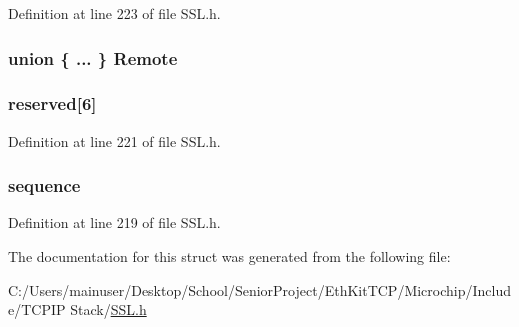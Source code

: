 Definition at line 223 of file S\+S\+L.\+h.

\hypertarget{struct_s_s_l___k_e_y_s_ac5c4b1f50a5eb4f54b15aba0d9add2de}{}
\subsubsection[{Remote}]{\setlength{\rightskip}{0pt plus 5cm}union \{ ... \}   Remote}\label{struct_s_s_l___k_e_y_s_ac5c4b1f50a5eb4f54b15aba0d9add2de}
\hypertarget{struct_s_s_l___k_e_y_s_a978913f88617d12113203d8129ab02a1}{}
\subsubsection[{reserved}]{ reserved\mbox{[}6\mbox{]}}\label{struct_s_s_l___k_e_y_s_a978913f88617d12113203d8129ab02a1}


Definition at line 221 of file S\+S\+L.\+h.

\hypertarget{struct_s_s_l___k_e_y_s_a8ae5d5027313c26248c36c3dcf205b55}{}
\subsubsection[{sequence}]{ sequence}\label{struct_s_s_l___k_e_y_s_a8ae5d5027313c26248c36c3dcf205b55}


Definition at line 219 of file S\+S\+L.\+h.



The documentation for this struct was generated from the following file\+:\begin{DoxyCompactItemize}
\item 
C\+:/\+Users/mainuser/\+Desktop/\+School/\+Senior\+Project/\+Eth\+Kit\+T\+C\+P/\+Microchip/\+Include/\+T\+C\+P\+I\+P Stack/\hyperlink{_s_s_l_8h}{S\+S\+L.\+h}\end{DoxyCompactItemize}
